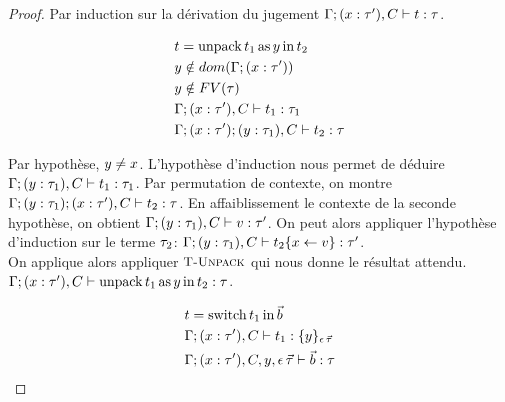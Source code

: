 \begin{lemma}
\begin{mathpar}
\end{mathpar}

\begin{proof}
Par induction sur la dérivation du jugement
  $\tycheck{\tyenvcons\tyenv\var{\ty'}, \csenv}{\term}{\ty}$.
  
\begin{equation*}
\begin{aligned}
  & \term = \kw{unpack} \term_1 \kw{as} y \kw{in} \term_2 \\
  & y \notin dom(\tyenvcons\tyenv\var{\ty'}) \\
  & y \notin FV(\ty) \\
  & \tycheck{\tyenvcons\tyenv\var{\ty'}, \csenv}{\term_1}{\ty_1} \\
  & \tycheck{\tyenvcons{\tyenvcons\tyenv\var{\ty'}}{y}{\ty_1}, \csenv}{\term_2}{\ty}
\end{aligned}
\end{equation*}

Par hypothèse, $y \neq \var$.
L'hypothèse d'induction nous permet de déduire 
  $\tycheck{\tyenvcons\tyenv{y}{\ty_1}, \csenv}{\term_1}{\ty_1}$.
Par permutation de contexte, on montre
  $\tycheck{\tyenvcons{\tyenvcons\tyenv{y}{\ty_1}}\var{\ty'}, \csenv}{\term_2}{\ty}$.
En affaiblissement le contexte de la seconde hypothèse, on obtient
  $\tycheck{\tyenvcons\tyenv{y}{\ty_1}, \csenv}{\val}{\ty'}$.
On peut alors appliquer l'hypothèse d'induction sur le terme $\ty_2$:
  $\tycheck{\tyenvcons\tyenv{y}{\ty_1}, \csenv}{\term_2\{\var \leftarrow \val\}}{\ty'}$.
\\
On applique alors appliquer $\rref{T-Unpack}$ qui nous donne le résultat attendu.
  $\tycheck{\tyenvcons\tyenv\var{\ty'}, \csenv}
           {\kw{unpack} \term_1 \kw{as} y \kw{in} \term_2}{\ty}$.

\begin{equation*}
\begin{aligned}
  & \term = \kw{switch} \term_1 \kw{in} \vec{b} \\
  & \tycheck{\tyenvcons\tyenv\var{\ty'}, \csenv}{\term_1}{\{y\}_{\dtype}} \\
  & \tycheck{\tyenvcons\tyenv\var{\ty'}, \csenv, y, {\dtype}}{\vec{b}}{\ty}
\end{aligned}
\end{equation*}


\end{proof}
\end{lemma}
